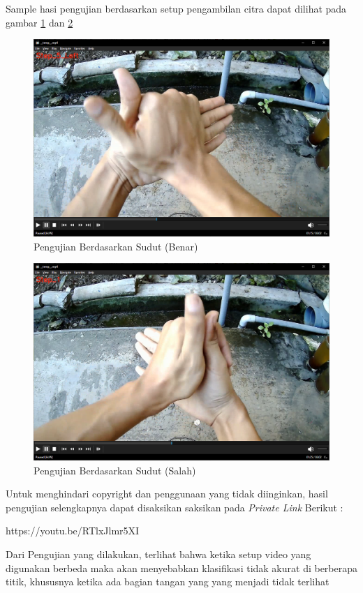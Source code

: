 Sample hasi pengujian berdasarkan setup pengambilan citra dapat dilihat pada gambar \ref{fig:setupbenar1} dan \ref{fig:setupsalah1}

\begin{figure}[!ht]
	\centering
	\includegraphics[width=0.6\columnwidth]{gambar/setupbenar1.png}
	\caption{Pengujian Berdasarkan Sudut (Benar)}
	\label{fig:setupbenar1}
\end{figure}
\begin{figure}[!ht]
	\centering
	\includegraphics[width=0.6\columnwidth]{gambar/setupsalah1.png}
	\caption{Pengujian Berdasarkan Sudut (Salah)}
	\label{fig:setupsalah1}
\end{figure}

Untuk menghindari copyright dan penggunaan yang tidak diinginkan, hasil pengujian selengkapnya dapat disaksikan saksikan pada \textit{Private Link} Berikut :
\begin{center}
	https://youtu.be/RTlxJlmr5XI
\end{center}

Dari Pengujian yang dilakukan, terlihat bahwa ketika setup video yang digunakan berbeda maka akan menyebabkan klasifikasi tidak akurat di berberapa titik, khususnya ketika ada bagian tangan yang yang menjadi tidak terlihat
